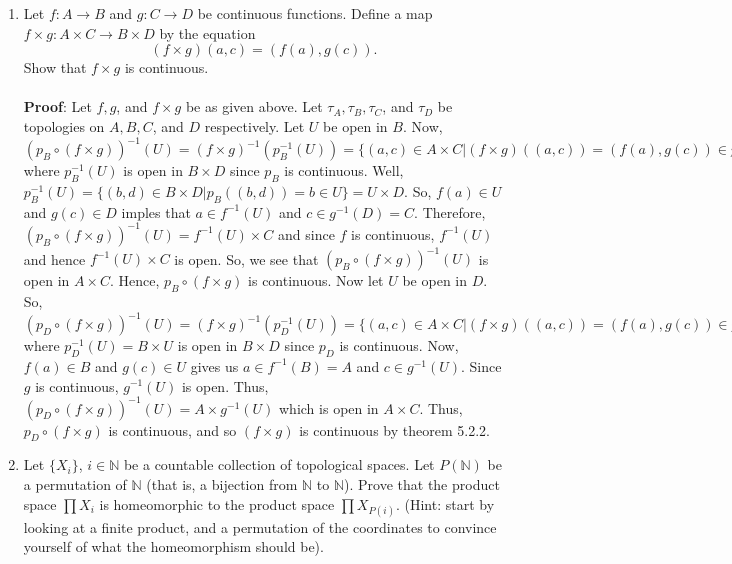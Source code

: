 \documentclass[12pt]{article}
\begin{document}
\begin{enumerate}
\item Let $f: A \to B$ and $g: C \to D$ be continuous functions. Define a map $f\times g: A\times C \to B\times D$ by the equation $$(f\times g)(a,c) = (f(a), g(c)).$$ Show that $f\times g$ is continuous.\\\\

\textbf{Proof}: Let $f, g$, and $f\times g$ be as given above. Let $\tau_A, \tau_B, \tau_C$, and $\tau_D$ be topologies on $A, B, C$, and $D$ respectively. Let $U$ be open in $B$. Now, $(p_B\circ(f\times g))^{-1}(U)=(f\times g)^{-1}(p_B^{-1}(U))=\{(a,c)\in A\times C|(f\times g)((a,c))=(f(a),g(c))\in p_B^{-1}(U)\}$ where $p_B^{-1}(U)$ is open in $B\times D$ since $p_B$ is continuous. Well, $p_B^{-1}(U)=\{(b,d)\in B\times D|p_B((b,d))=b\in U\}=U\times D$. So, $f(a)\in U$ and $g(c)\in D$ imples that $a\in f^{-1}(U)$ and $c\in g^{-1}(D)=C$. Therefore, $(p_B\circ(f\times g))^{-1}(U)=f^{-1}(U)\times C$ and since $f$ is continuous, $f^{-1}(U)$ and hence $f^{-1}(U)\times C$ is open. So, we see that $(p_B\circ(f\times g))^{-1}(U)$ is open in $A\times C$. Hence, $p_B\circ(f\times g)$ is continuous. Now let $U$ be open in $D$. So, $(p_D\circ(f\times g))^{-1}(U)=(f\times g)^{-1}(p_D^{-1}(U))=\{(a,c)\in A\times C|(f\times g)((a,c))=(f(a),g(c))\in p_D^{-1}(U)\}$ where $p_D^{-1}(U)=B\times U$ is open in $B\times D$ since $p_D$ is continuous. Now, $f(a)\in B$ and $g(c)\in U$ gives us $a\in f^{-1}(B)=A$ and $c\in g^{-1}(U)$. Since $g$ is continuous, $g^{-1}(U)$ is open. Thus, $(p_D\circ(f\times g))^{-1}(U)=A\times g^{-1}(U)$ which is open in $A\times C$. Thus, $p_D\circ(f\times g)$ is continuous, and so $(f\times g)$ is continuous by theorem 5.2.2. 

\item Let $\{X_i\}$, $i\in \mathbb{N}$ be a countable collection of topological spaces. Let $P(\mathbb{N})$ be a permutation of $\mathbb{N}$ (that is, a bijection from $\mathbb{N}$ to $\mathbb{N}$). Prove that the product space $\prod X_i$ is homeomorphic to the product space $\prod X_{P(i)}$. (Hint: start by looking at a finite product, and a permutation of the coordinates to convince yourself of what the homeomorphism should be).\\\\


\end{enumerate}
\end{document}
